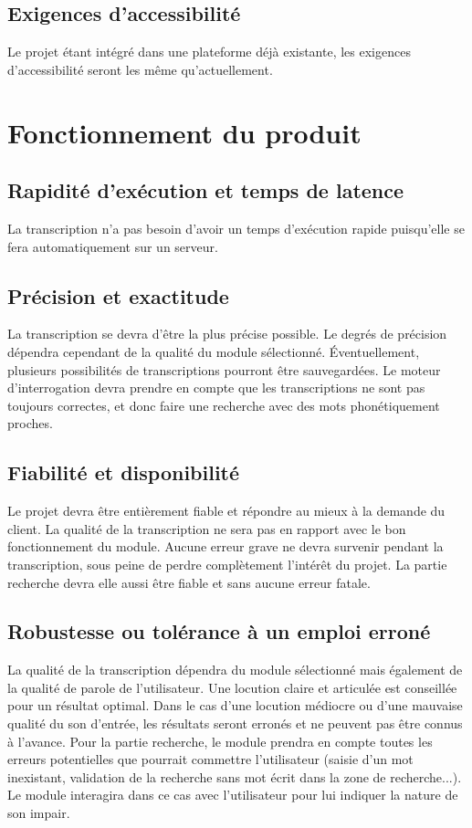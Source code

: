 	
	
		\subsection{Exigences d’accessibilité}
		Le projet étant intégré dans une plateforme déjà existante, les exigences d'accessibilité seront les même qu'actuellement.
	
	
	\section{Fonctionnement du produit}
		\subsection{Rapidité d’exécution et temps de latence}
		La transcription n'a pas besoin d'avoir un temps d'exécution rapide puisqu'elle se fera automatiquement sur un serveur. 

		
		\subsection{Précision et exactitude}
		La transcription se devra d'être la plus précise possible. Le degrés de précision dépendra cependant de la qualité du module sélectionné.   Éventuellement, plusieurs possibilités de transcriptions pourront être sauvegardées. Le moteur d'interrogation devra prendre en compte que les transcriptions ne sont pas toujours correctes, et donc faire une recherche avec des mots phonétiquement proches.
	
		\subsection{Fiabilité et disponibilité}
		Le projet devra être entièrement fiable et répondre au mieux à la demande du client. La qualité de la transcription ne sera pas en rapport avec le bon fonctionnement du module. Aucune erreur grave ne devra survenir pendant la transcription, sous peine de perdre complètement l'intérêt du projet. La partie recherche devra elle aussi être fiable et sans aucune erreur fatale. 
	
		\subsection{Robustesse ou tolérance à un emploi erroné}
		La qualité de la transcription dépendra du module sélectionné mais également de la qualité de parole de l'utilisateur. Une locution claire et articulée est conseillée pour un résultat optimal. Dans le cas d'une locution médiocre ou d'une mauvaise qualité du son d'entrée, les résultats seront erronés et ne peuvent pas être connus à l'avance. 
		Pour la partie recherche, le module prendra en compte toutes les erreurs potentielles que pourrait commettre l'utilisateur (saisie d'un mot inexistant, validation de la recherche sans mot écrit dans la zone de recherche...). Le module interagira dans ce cas avec l'utilisateur pour lui indiquer la nature de son impair. 
 
